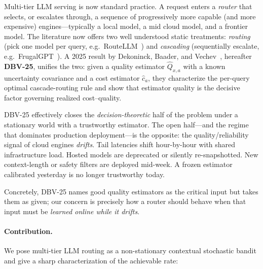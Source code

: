 \documentclass[11pt]{article}
\theoremstyle{definition}
\begin{document}
Multi-tier LLM serving is now standard practice. A request enters a
\emph{router} that selects, or escalates through, a sequence of progressively
more capable (and more expensive) engines---typically a local model, a mid
cloud model, and a frontier model. The literature now offers two well
understood static treatments: \emph{routing} (pick one model per query,
e.g.\ RouteLLM~\cite{ong2024routellm}) and \emph{cascading} (sequentially
escalate, e.g.\ FrugalGPT~\cite{chen2023frugalgpt}). A 2025 result by
Dekoninck, Baader, and Vechev~\cite{dekoninck2025unified}, hereafter
\textbf{DBV-25}, unifies the two: given a quality estimator
$\widehat{Q}_{x,a}$ with a known uncertainty covariance and a cost estimator
$\widehat{c}_a$, they characterize the per-query optimal cascade-routing
rule and show that estimator quality is the decisive factor governing
realized cost--quality.

DBV-25 effectively closes the \emph{decision-theoretic} half of the problem
under a stationary world with a trustworthy estimator. The open half---and
the regime that dominates production deployment---is the opposite: the
quality/reliability signal of cloud engines \emph{drifts}. Tail latencies
shift hour-by-hour with shared infrastructure load. Hosted models are
deprecated or silently re-snapshotted. New context-length or safety filters
are deployed mid-week. A frozen estimator calibrated yesterday is no longer
trustworthy today.

Concretely, DBV-25 names good quality estimators as the critical input but
takes them as given; our concern is precisely how a router should behave
when that input must be \emph{learned online while it drifts}.

\paragraph{Contribution.}
We pose multi-tier LLM routing as a non-stationary contextual stochastic
bandit and give a sharp characterization of the achievable rate:
\end{document}
